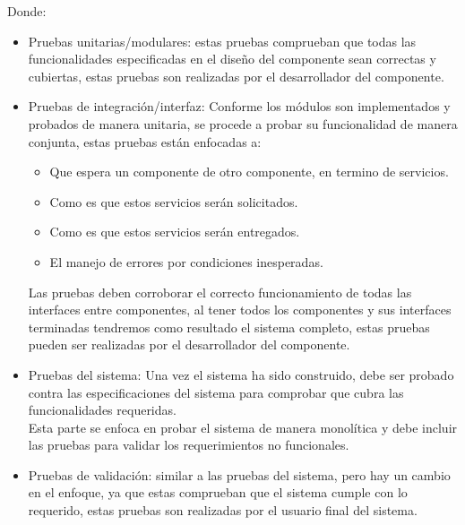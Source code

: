 Donde:
\begin{itemize}

    \item Pruebas unitarias/modulares: estas pruebas comprueban que todas las funcionalidades especificadas en el diseño del componente sean correctas y cubiertas, estas pruebas son realizadas por el desarrollador del componente.
    
    \item Pruebas de integración/interfaz:
    Conforme los módulos son implementados y probados de manera unitaria, se procede a probar su funcionalidad de manera conjunta, estas pruebas están enfocadas a:
    
    \begin{itemize}
        \item Que espera un componente de otro componente, en termino de servicios.
        \item Como es que estos servicios serán solicitados.
        \item Como es que estos servicios serán entregados.
        \item El manejo de errores por condiciones inesperadas.
    \end{itemize}
    
    Las pruebas deben corroborar el correcto funcionamiento de todas las interfaces entre componentes, al tener todos los componentes y sus interfaces terminadas tendremos como resultado el sistema completo, estas pruebas pueden ser realizadas por el desarrollador del componente.
    
    \item Pruebas del sistema: Una vez el sistema ha sido construido, debe ser probado contra las especificaciones del sistema para comprobar que cubra las funcionalidades requeridas.\\
    Esta parte se enfoca en probar el sistema de manera monolítica y debe incluir las pruebas para validar los requerimientos no funcionales.

    \item Pruebas de validación: similar a las pruebas del sistema, pero hay un cambio en el enfoque, ya que estas comprueban que el sistema cumple con lo requerido, estas pruebas son realizadas por el usuario final del sistema.

\end{itemize}

